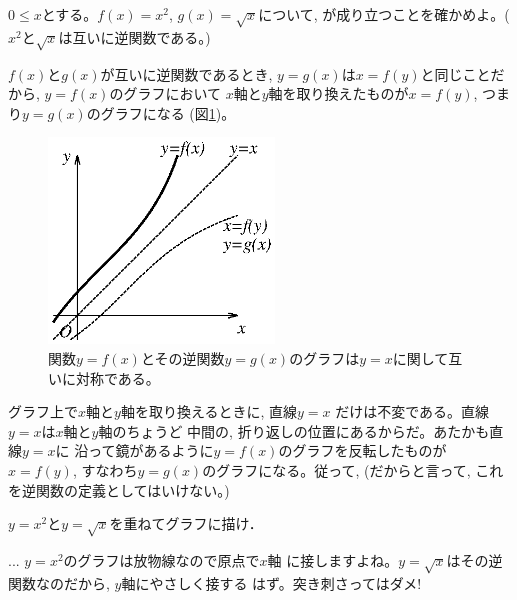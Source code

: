 \begin{q}\label{q:func_inv1} $0\le x$とする。$f(x)=x^2$, $g(x)=\sqrt{x}$について,
 が成り立つことを確かめよ。($x^2$と$\sqrt{x}$は互いに逆関数である。)\end{q}\mv

$f(x)$と$g(x)$が互いに逆関数であるとき, $y=g(x)$は$x=f(y)$と同じことだから, $y=f(x)$のグラフにおいて
$x$軸と$y$軸を取り換えたものが$x=f(y)$, つまり$y=g(x)$のグラフになる
(図\ref{fig:func_revfunc})。

\begin{figure}[h]
    \centering
    \includegraphics[width=6cm]{func_revfunc.eps}
    \caption{関数$y=f(x)$とその逆関数$y=g(x)$のグラフは$y=x$に関して互いに対称である。\label{fig:func_revfunc}}
\end{figure}

グラフ上で$x$軸と$y$軸を取り換えるときに, 直線$y=x$
だけは不変である。直線$y=x$は$x$軸と$y$軸のちょうど
中間の, 折り返しの位置にあるからだ。あたかも直線$y=x$に
沿って鏡があるように$y=f(x)$のグラフを反転したものが
$x=f(y)$, すなわち$y=g(x)$のグラフになる。従って, 
(だからと言って, これを逆関数の定義としてはいけない。)

\begin{q}\label{q:func_inv2} $y=x^2$と$y=\sqrt{x}$を重ねてグラフに描け．\end{q}

\begin{freqmiss}{\small{} ... $y=x^2$のグラフは放物線なので原点で$x$軸
に接しますよね。$y=\sqrt{x}$はその逆関数なのだから, $y$軸にやさしく接する
はず。突き刺さってはダメ!}\end{freqmiss}

\mv

